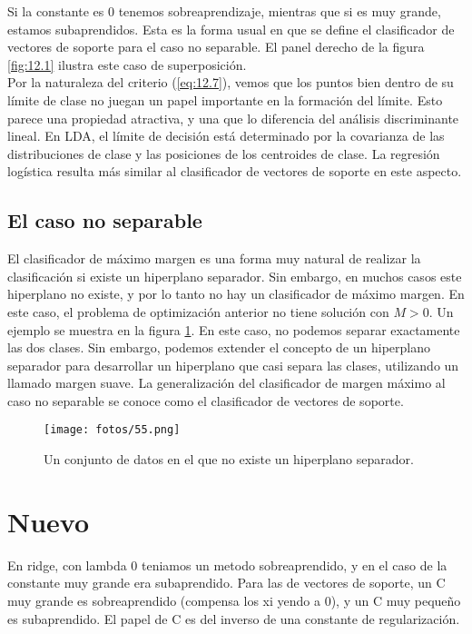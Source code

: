 Si la constante es 0 tenemos sobreaprendizaje, mientras que si es muy grande, estamos subaprendidos. Esta es la forma usual en que se define el clasificador de vectores de soporte para el caso no separable. El panel derecho de la figura \ref{fig:12.1} ilustra este caso de superposición. \\

Por la naturaleza del criterio (\ref{eq:12.7}), vemos que los puntos bien dentro de su límite de clase no juegan un papel importante en la formación del límite. Esto parece una propiedad atractiva, y una que lo diferencia del análisis discriminante lineal. En LDA, el límite de decisión está determinado por la covarianza de las distribuciones de clase y las posiciones de los centroides de clase. La regresión logística resulta más similar al clasificador de vectores de soporte en este aspecto.

\subsection{El caso no separable}

El clasificador de máximo margen es una forma muy natural de realizar la clasificación si existe un hiperplano separador. Sin embargo, en muchos casos este hiperplano no existe, y por lo tanto no hay un clasificador de máximo margen. En este caso, el problema de optimización anterior no tiene solución con $M > 0$. Un ejemplo se muestra en la figura \ref{fig:9.4}. En este caso, no podemos separar exactamente las dos clases. Sin embargo, podemos extender el concepto de un hiperplano separador para desarrollar un hiperplano que casi separa las clases, utilizando un llamado margen suave. La generalización del clasificador de margen máximo al caso no separable se conoce como el clasificador de vectores de soporte.

\begin{figure}[h]
\centering
\texttt{[image: fotos/55.png]}
\caption{Un conjunto de datos en el que no existe un hiperplano separador.}
\label{fig:9.4}
\end{figure}








\section{Nuevo}


En ridge, con lambda 0 teniamos un metodo sobreaprendido, y en el caso de la constante muy grande era subaprendido. Para las de vectores de soporte, un C muy grande es sobreaprendido (compensa los xi yendo a 0), y un C muy pequeño es subaprendido. El papel de C es del inverso de una constante de regularización. \\


